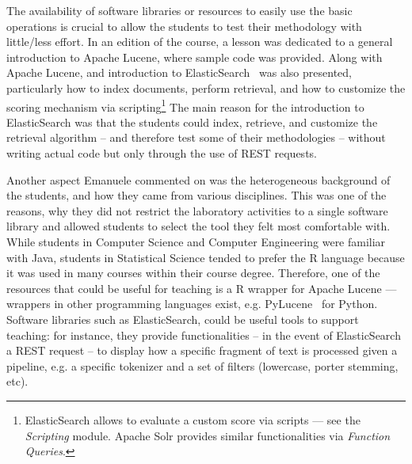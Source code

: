 The availability of software libraries or resources to easily use the basic operations is crucial to allow the students to test their methodology with little/less effort. In an edition of the course, a lesson was dedicated to a general introduction to Apache Lucene, where sample code was  provided. Along with Apache Lucene, and introduction to ElasticSearch~\cite{elasticsearch} was also presented, particularly how to index documents, perform retrieval, and how to customize the scoring mechanism via scripting\footnote{\scriptsize{ElasticSearch allows to evaluate a custom score via scripts --- see the {\em Scripting} module. Apache Solr provides similar functionalities via {\em Function Queries}.}} The main reason for the introduction to ElasticSearch was that the students could index, retrieve, and customize the retrieval algorithm -- and therefore test some of their methodologies -- without writing actual code but only through the use of REST requests.

Another aspect Emanuele commented on was the heterogeneous background of the students, and how they came from various disciplines. This was one of the reasons, why they did not restrict the laboratory activities to a single software library and  allowed students to select the tool they felt most comfortable with. While students in Computer Science and Computer Engineering were familiar with Java, students in Statistical Science tended to prefer the R language because it was used in many courses within their course degree. Therefore, one of the resources that could be useful for teaching is a R wrapper for Apache Lucene --- wrappers in other programming languages exist, e.g. PyLucene~\cite{PyLucene} for Python. Software libraries such as ElasticSearch, could be useful tools to support teaching: for instance, they provide functionalities -- in the event of ElasticSearch a REST request -- to display how a specific fragment of text is processed given a pipeline, e.g. a specific tokenizer and a set of filters (lowercase, porter stemming, etc).



